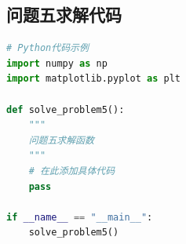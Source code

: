 \documentclass[fontset=SimSun]{ctexart}
\begin{document}
\subsection{问题五求解代码}

\begin{lstlisting}[language=Python, caption=问题五求解代码]
# Python代码示例
import numpy as np
import matplotlib.pyplot as plt

def solve_problem5():
    """
    问题五求解函数
    """
    # 在此添加具体代码
    pass

if __name__ == "__main__":
    solve_problem5()
\end{lstlisting}


\end{document}
